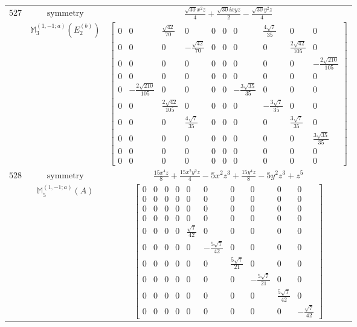 \documentclass[fleqn,8pt,landscape]{jsarticle}
\begin{document}
\begin{longtable}{ccc}
$ 527 $ & $ \text{symmetry} $ & $ \frac{\sqrt{30} x^{2} z}{4} + \frac{\sqrt{30} i x y z}{2} - \frac{\sqrt{30} y^{2} z}{4} $ \\
$  $ & $ \mathbb{M}_{3}^{(1,-1;a)}(E_{2}^{(b)}) $ & $ \begin{bmatrix} 0 & 0 & \frac{\sqrt{42}}{70} & 0 & 0 & 0 & 0 & \frac{4 \sqrt{7}}{35} & 0 & 0 \\ 0 & 0 & 0 & - \frac{\sqrt{42}}{70} & 0 & 0 & 0 & 0 & \frac{2 \sqrt{42}}{105} & 0 \\ 0 & 0 & 0 & 0 & 0 & 0 & 0 & 0 & 0 & - \frac{2 \sqrt{210}}{105} \\ 0 & 0 & 0 & 0 & 0 & 0 & 0 & 0 & 0 & 0 \\ 0 & - \frac{2 \sqrt{210}}{105} & 0 & 0 & 0 & 0 & - \frac{3 \sqrt{35}}{35} & 0 & 0 & 0 \\ 0 & 0 & \frac{2 \sqrt{42}}{105} & 0 & 0 & 0 & 0 & - \frac{3 \sqrt{7}}{35} & 0 & 0 \\ 0 & 0 & 0 & \frac{4 \sqrt{7}}{35} & 0 & 0 & 0 & 0 & \frac{3 \sqrt{7}}{35} & 0 \\ 0 & 0 & 0 & 0 & 0 & 0 & 0 & 0 & 0 & \frac{3 \sqrt{35}}{35} \\ 0 & 0 & 0 & 0 & 0 & 0 & 0 & 0 & 0 & 0 \\ 0 & 0 & 0 & 0 & 0 & 0 & 0 & 0 & 0 & 0 \end{bmatrix} $ \\ \hline
$ 528 $ & $ \text{symmetry} $ & $ \frac{15 x^{4} z}{8} + \frac{15 x^{2} y^{2} z}{4} - 5 x^{2} z^{3} + \frac{15 y^{4} z}{8} - 5 y^{2} z^{3} + z^{5} $ \\
$  $ & $ \mathbb{M}_{5}^{(1,-1;a)}(A) $ & $ \begin{bmatrix} 0 & 0 & 0 & 0 & 0 & 0 & 0 & 0 & 0 & 0 \\ 0 & 0 & 0 & 0 & 0 & 0 & 0 & 0 & 0 & 0 \\ 0 & 0 & 0 & 0 & 0 & 0 & 0 & 0 & 0 & 0 \\ 0 & 0 & 0 & 0 & 0 & 0 & 0 & 0 & 0 & 0 \\ 0 & 0 & 0 & 0 & \frac{\sqrt{7}}{42} & 0 & 0 & 0 & 0 & 0 \\ 0 & 0 & 0 & 0 & 0 & - \frac{5 \sqrt{7}}{42} & 0 & 0 & 0 & 0 \\ 0 & 0 & 0 & 0 & 0 & 0 & \frac{5 \sqrt{7}}{21} & 0 & 0 & 0 \\ 0 & 0 & 0 & 0 & 0 & 0 & 0 & - \frac{5 \sqrt{7}}{21} & 0 & 0 \\ 0 & 0 & 0 & 0 & 0 & 0 & 0 & 0 & \frac{5 \sqrt{7}}{42} & 0 \\ 0 & 0 & 0 & 0 & 0 & 0 & 0 & 0 & 0 & - \frac{\sqrt{7}}{42} \end{bmatrix} $ \\ \hline

\end{longtable}
\end{document}
